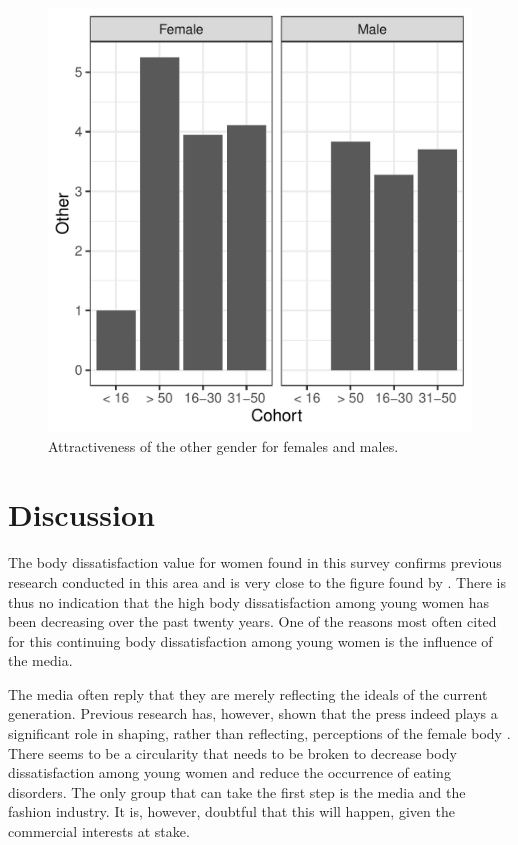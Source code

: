 \documentclass[a4paper, jou]{apa6}
\begin{document}
\begin{figure}[htbp]
\centering
\includegraphics[width=.9\linewidth]{attractiveness.pdf}
\caption{Attractiveness of the other gender for females and males. \label{other}}
\end{figure}

\section{Discussion}
\label{sec:org4379923}
The body dissatisfaction value for women found in this survey confirms previous research conducted in this area and is very close to the figure found by . There is thus no indication that the high body dissatisfaction among young women has been decreasing over the past twenty years. One of the reasons most often cited for this continuing body dissatisfaction among young women is the influence of the media. 

The media often reply that they are merely reflecting the ideals of the current generation. Previous research has, however, shown that the press indeed plays a significant role in shaping, rather than reflecting, perceptions of the female body \cite{turner_influence_1997}. There seems to be a circularity that needs to be broken to decrease body dissatisfaction among young women and reduce the occurrence of eating disorders. The only group that can take the first step is the media and the fashion industry. It is, however, doubtful that this will happen, given the commercial interests at stake.
\end{document}
